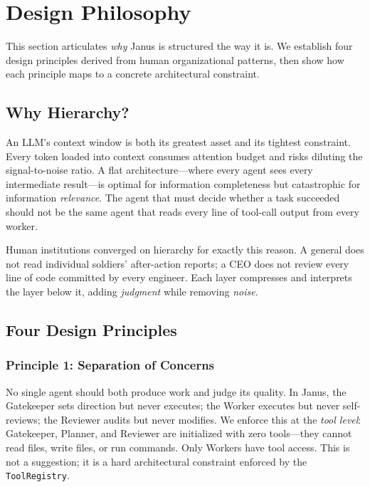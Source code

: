 \documentclass[11pt,a4paper]{article}
\begin{document}
\section{Design Philosophy}

This section articulates \emph{why} Janus is structured the way it is.
We establish four design principles derived from human organizational patterns,
then show how each principle maps to a concrete architectural constraint.

\subsection{Why Hierarchy?}

An LLM's context window is both its greatest asset and its tightest constraint.
Every token loaded into context consumes attention budget and risks diluting
the signal-to-noise ratio. A flat architecture---where every agent sees every
intermediate result---is optimal for information completeness but catastrophic
for information \emph{relevance}. The agent that must decide whether a task
succeeded should not be the same agent that reads every line of tool-call
output from every worker.

Human institutions converged on hierarchy for exactly this reason. A general
does not read individual soldiers' after-action reports; a CEO does not
review every line of code committed by every engineer. Each layer compresses
and interprets the layer below it, adding \emph{judgment} while removing
\emph{noise}.

\subsection{Four Design Principles}

\subsubsection*{Principle 1: Separation of Concerns}
\label{sec:sep-concerns}

No single agent should both produce work and judge its quality.
In Janus, the Gatekeeper sets direction but never executes; the Worker executes
but never self-reviews; the Reviewer audits but never modifies.
We enforce this at the \emph{tool level}: Gatekeeper, Planner, and Reviewer are
initialized with zero tools---they cannot read files, write files, or run
commands. Only Workers have tool access. This is not a suggestion; it is a
hard architectural constraint enforced by the \texttt{ToolRegistry}.
\end{document}
